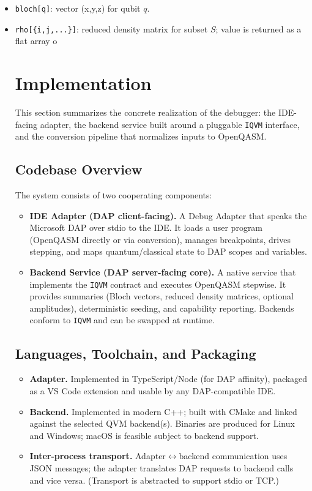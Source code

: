 \documentclass[12pt]{article}
\begin{document}
\begin{itemize}
  \item \texttt{bloch[q]}: vector (x,y,z) for qubit $q$.
  \item \texttt{rho[\{i,j,...\}]}: reduced density matrix for subset $S$; value is returned as a flat array o

\section{Implementation}
\label{sec:implementation}

This section summarizes the concrete realization of the debugger: the IDE-facing adapter, the backend service built around a pluggable \texttt{IQVM} interface, and the conversion pipeline that normalizes inputs to OpenQASM.

\subsection{Codebase Overview}

The system consists of two cooperating components:

\begin{itemize}
  \item \textbf{IDE Adapter (DAP client-facing).} A Debug Adapter that speaks the Microsoft DAP over stdio to the IDE. It loads a user program (OpenQASM directly or via conversion), manages breakpoints, drives stepping, and maps quantum/classical state to DAP scopes and variables.
  \item \textbf{Backend Service (DAP server-facing core).} A native service that implements the \texttt{IQVM} contract and executes OpenQASM stepwise. It provides summaries (Bloch vectors, reduced density matrices, optional amplitudes), deterministic seeding, and capability reporting. Backends conform to \texttt{IQVM} and can be swapped at runtime.
\end{itemize}

\subsection{Languages, Toolchain, and Packaging}

\begin{itemize}
  \item \textbf{Adapter.} Implemented in TypeScript/Node (for DAP affinity), packaged as a VS Code extension and usable by any DAP-compatible IDE.
  \item \textbf{Backend.} Implemented in modern C++; built with CMake and linked against the selected QVM backend(s). Binaries are produced for Linux and Windows; macOS is feasible subject to backend support.
  \item \textbf{Inter-process transport.} Adapter\(\leftrightarrow\)backend communication uses JSON messages; the adapter translates DAP requests to backend calls and vice versa. (Transport is abstracted to support stdio or TCP.)
\end{itemize}


\end{itemize}
\end{document}
